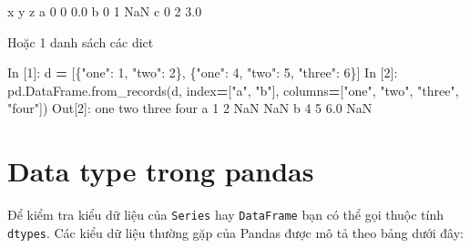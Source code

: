 \documentclass[
]{book}
\newenvironment{Shaded}{\begin{snugshade}}{\end{snugshade}}
\newcommand{\DecValTok}[1]{\textcolor[rgb]{0.00,0.00,0.81}{#1}}
\newcommand{\FloatTok}[1]{\textcolor[rgb]{0.00,0.00,0.81}{#1}}
\newcommand{\NormalTok}[1]{#1}
\newcommand{\OperatorTok}[1]{\textcolor[rgb]{0.81,0.36,0.00}{\textbf{#1}}}
\newcommand{\StringTok}[1]{\textcolor[rgb]{0.31,0.60,0.02}{#1}}
\begin{document}
\begin{Shaded}
\begin{Highlighting}[]
\NormalTok{   x  y    z}
\NormalTok{a  }\DecValTok{0}  \DecValTok{0}  \FloatTok{0.0}
\NormalTok{b  }\DecValTok{0}  \DecValTok{1}\NormalTok{  NaN}
\NormalTok{c  }\DecValTok{0}  \DecValTok{2}  \FloatTok{3.0}
\end{Highlighting}
\end{Shaded}

Hoặc 1 danh sách các dict

\begin{Shaded}
\begin{Highlighting}[]
\NormalTok{In [}\DecValTok{1}\NormalTok{]: d }\OperatorTok{=}\NormalTok{ [\{}\StringTok{"one"}\NormalTok{: }\DecValTok{1}\NormalTok{, }\StringTok{"two"}\NormalTok{: }\DecValTok{2}\NormalTok{\}, \{}\StringTok{"one"}\NormalTok{: }\DecValTok{4}\NormalTok{, }\StringTok{"two"}\NormalTok{: }\DecValTok{5}\NormalTok{, }\StringTok{"three"}\NormalTok{: }\DecValTok{6}\NormalTok{\}]}
\NormalTok{In [}\DecValTok{2}\NormalTok{]: pd.DataFrame.from\_records(d, index}\OperatorTok{=}\NormalTok{[}\StringTok{"a"}\NormalTok{, }\StringTok{"b"}\NormalTok{], columns}\OperatorTok{=}\NormalTok{[}\StringTok{"one"}\NormalTok{, }\StringTok{"two"}\NormalTok{, }\StringTok{"three"}\NormalTok{, }\StringTok{"four"}\NormalTok{])}
\NormalTok{Out[}\DecValTok{2}\NormalTok{]:}
\NormalTok{   one  two  three  four}
\NormalTok{a    }\DecValTok{1}    \DecValTok{2}\NormalTok{    NaN   NaN}
\NormalTok{b    }\DecValTok{4}    \DecValTok{5}    \FloatTok{6.0}\NormalTok{   NaN}
\end{Highlighting}
\end{Shaded}

\hypertarget{data-type-trong-pandas}{%
\section{Data type trong pandas}\label{data-type-trong-pandas}}

Để kiểm tra kiểu dữ liệu của \texttt{Series} hay \texttt{DataFrame} bạn có thể gọi thuộc tính \texttt{dtypes}. Các kiểu dữ liệu thường gặp của Pandas được mô tả theo bảng dưới đây:
\end{document}
